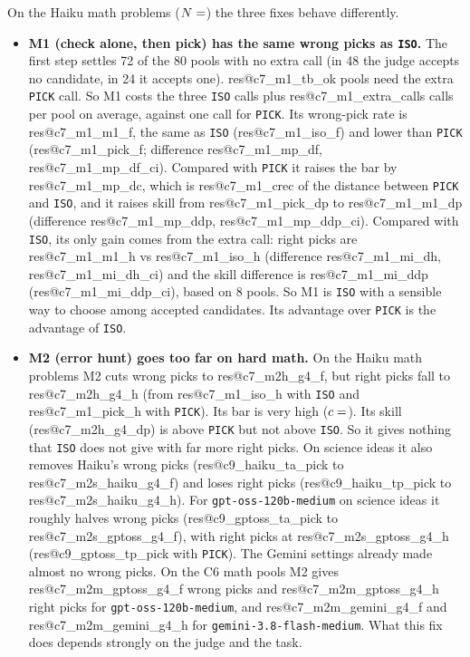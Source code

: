\documentclass[10pt,twocolumn]{article}
\makeatletter
\newcommand{\res}[1]{\csname res@#1\endcsname}
\makeatother
\begin{document}
On the Haiku math problems ($N=\res{c7_m1_n}$) the three fixes behave differently.
\begin{itemize}\setlength{\itemsep}{2pt}
\item \textbf{M1 (check alone, then pick) has the same wrong picks as \texttt{ISO}.} The first step settles 72 of the 80 pools with no extra call (in 48 the judge accepts no candidate, in 24 it accepts one). \res{c7_m1_tb_ok} pools need the extra \texttt{PICK} call. So M1 costs the three \texttt{ISO} calls plus \res{c7_m1_extra_calls} calls per pool on average, against one call for \texttt{PICK}. Its wrong-pick rate is \res{c7_m1_m1_f}, the same as \texttt{ISO} (\res{c7_m1_iso_f}) and lower than \texttt{PICK} (\res{c7_m1_pick_f}; difference \res{c7_m1_mp_df}, \res{c7_m1_mp_df_ci}). Compared with \texttt{PICK} it raises the bar by \res{c7_m1_mp_dc}, which is \res{c7_m1_crec} of the distance between \texttt{PICK} and \texttt{ISO}, and it raises skill from \res{c7_m1_pick_dp} to \res{c7_m1_m1_dp} (difference \res{c7_m1_mp_ddp}, \res{c7_m1_mp_ddp_ci}). Compared with \texttt{ISO}, its only gain comes from the extra call: right picks are \res{c7_m1_m1_h} vs \res{c7_m1_iso_h} (difference \res{c7_m1_mi_dh}, \res{c7_m1_mi_dh_ci}) and the skill difference is \res{c7_m1_mi_ddp} (\res{c7_m1_mi_ddp_ci}), based on 8 pools. So M1 is \texttt{ISO} with a sensible way to choose among accepted candidates. Its advantage over \texttt{PICK} is the advantage of \texttt{ISO}.
\item \textbf{M2 (error hunt) goes too far on hard math.} On the Haiku math problems M2 cuts wrong picks to \res{c7_m2h_g4_f}, but right picks fall to \res{c7_m2h_g4_h} (from \res{c7_m1_iso_h} with \texttt{ISO} and \res{c7_m1_pick_h} with \texttt{PICK}). Its bar is very high ($c = \res{c7_m2h_g4_c}$). Its skill (\res{c7_m2h_g4_dp}) is above \texttt{PICK} but not above \texttt{ISO}. So it gives nothing that \texttt{ISO} does not give with far more right picks. On science ideas it also removes Haiku's wrong picks (\res{c9_haiku_ta_pick} to \res{c7_m2s_haiku_g4_f}) and loses right picks (\res{c9_haiku_tp_pick} to \res{c7_m2s_haiku_g4_h}). For \texttt{gpt-oss-120b-medium} on science ideas it roughly halves wrong picks (\res{c9_gptoss_ta_pick} to \res{c7_m2s_gptoss_g4_f}), with right picks at \res{c7_m2s_gptoss_g4_h} (\res{c9_gptoss_tp_pick} with \texttt{PICK}). The Gemini settings already made almost no wrong picks. On the C6 math pools M2 gives \res{c7_m2m_gptoss_g4_f} wrong picks and \res{c7_m2m_gptoss_g4_h} right picks for \texttt{gpt-oss-120b-medium}, and \res{c7_m2m_gemini_g4_f} and \res{c7_m2m_gemini_g4_h} for \texttt{gemini-3.8-flash-medium}. What this fix does depends strongly on the judge and the task.

\end{itemize}
\end{document}
